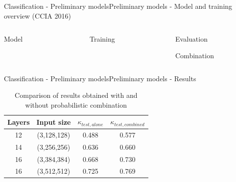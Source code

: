 \documentclass{beamer}
\begin{document}
\begin{frame}{Classification - Preliminary models}{Preliminary models - Model and training overview (CCIA 2016)}	
\begin{columns}
\begin{column}{0.2\textwidth}
	\centering
	\alert{Model}
	\begin{figure}[p]
	\end{figure}
\end{column}
\begin{column}{0.4\textwidth}
	\centering
	\alert{Training}
	\begin{figure}[p]
	\end{figure}	
\end{column}
\begin{column}{0.4\textwidth}  %
	\alert{Evaluation}
	\begin{figure}[p]
	\end{figure}
	\alert{Combination}
	\begin{figure}[p]
	\end{figure}
\end{column}
\end{columns}	
\end{frame}

\begin{frame}{Classification - Preliminary models}{Preliminary models - Results}	
\begin{table}[h!]
\centering
\begin{tabular}{c c c c} 
\hline		
Layers & Input size & $\kappa_{test, alone}$ & $\kappa_{test, combined}$\\ [0.5ex] 
\hline\hline
12 & (3,128,128) & 0.488 & 0.577\\ 
14 & (3,256,256) & 0.636 & 0.660\\ 
16 & (3,384,384) & 0.668 & 0.730 \\ 
16 & (3,512,512) & 0.725 & 0.769\\ 
\hline
\end{tabular}
\caption{Comparison of results obtained with and without probabilistic combination}
\label{table-results2}
\end{table}
\end{frame}
\end{document}
